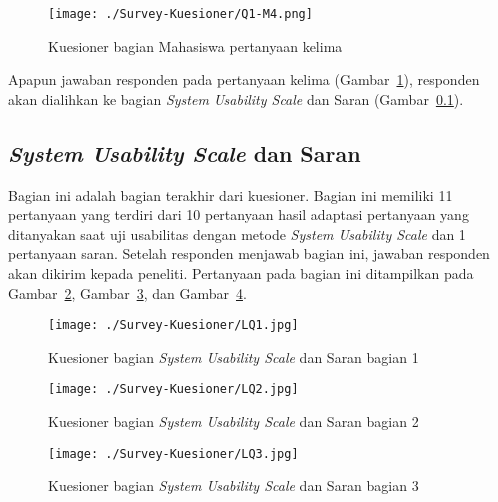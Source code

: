 \begin{figure}[H]
	\centering  
	\texttt{[image: ./Survey-Kuesioner/Q1-M4.png]}  
	\caption[Kuesioner bagian Mahasiswa pertanyaan kelima]{Kuesioner bagian Mahasiswa pertanyaan kelima} 
	\label{fig:q1-m4} 
\end{figure}

Apapun jawaban responden pada pertanyaan kelima (Gambar~\ref{fig:q1-m4}), responden akan dialihkan ke bagian \textit{System Usability Scale} dan Saran (Gambar~\ref{subsec:final}).

\subsection{\textit{System Usability Scale} dan Saran}
\label{subsec:final}

Bagian ini adalah bagian terakhir dari kuesioner. Bagian ini memiliki 11 pertanyaan yang terdiri dari 10 pertanyaan hasil adaptasi pertanyaan yang ditanyakan saat uji usabilitas dengan metode \textit{System Usability Scale} dan 1 pertanyaan saran. Setelah responden menjawab bagian ini, jawaban responden akan dikirim kepada peneliti. Pertanyaan pada bagian ini ditampilkan pada Gambar~\ref{fig:lq1}, Gambar~\ref{fig:lq2}, dan Gambar~\ref{fig:lq3}.

\begin{figure}[H]
	\centering  
	\texttt{[image: ./Survey-Kuesioner/LQ1.jpg]} 
	\caption[Kuesioner bagian \textit{System Usability Scale} dan Saran bagian 1]{Kuesioner bagian \textit{System Usability Scale} dan Saran bagian 1} 
	\label{fig:lq1} 
\end{figure}

\begin{figure}[H]
	\centering  
	\texttt{[image: ./Survey-Kuesioner/LQ2.jpg]}  
	\caption[Kuesioner bagian \textit{System Usability Scale} dan Saran bagian 2]{Kuesioner bagian \textit{System Usability Scale} dan Saran bagian 2} 
	\label{fig:lq2} 
\end{figure}

\begin{figure}[H]
	\centering  
	\texttt{[image: ./Survey-Kuesioner/LQ3.jpg]}  
	\caption[Kuesioner bagian \textit{System Usability Scale} dan Saran bagian 3]{Kuesioner bagian \textit{System Usability Scale} dan Saran bagian 3} 
	\label{fig:lq3} 
\end{figure}

\label{sec:full-result-survey}
